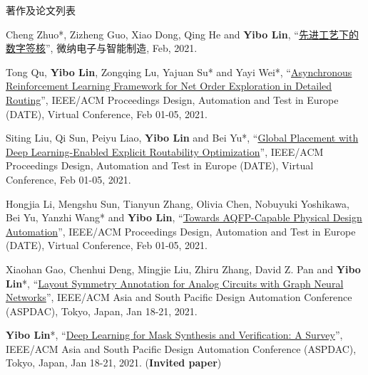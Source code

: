 \begin{rSection}{著作及论文列表}
\begin{description}[font=\normalfont, rightmargin=2em]
{}
            

\item[{[J69]}]{
        Cheng Zhuo*, Zizheng Guo, Xiao Dong, Qing He and \textbf{Yibo Lin}, 
    ``\href{https://doi.org/ 10.19816/j.cnki.10-1594/tn.2021.02.001}{先进工艺下的数字签核}'', 
    微纳电子与智能制造, Feb, 2021.
    
}
            

\item[{[C68]}]{
        Tong Qu, \textbf{Yibo Lin}, Zongqing Lu, Yajuan Su* and Yayi Wei*, 
    ``\href{https://doi.org/10.23919/DATE51398.2021.9474007}{Asynchronous Reinforcement Learning Framework for Net Order Exploration in Detailed Routing}'', 
    IEEE/ACM Proceedings Design, Automation and Test in Europe (DATE), Virtual Conference, Feb 01-05, 2021.
    
}
            

\item[{[C67]}]{
        Siting Liu, Qi Sun, Peiyu Liao, \textbf{Yibo Lin} and Bei Yu*, 
    ``\href{https://doi.org/10.23919/DATE51398.2021.9473959}{Global Placement with Deep Learning-Enabled Explicit Routability Optimization}'', 
    IEEE/ACM Proceedings Design, Automation and Test in Europe (DATE), Virtual Conference, Feb 01-05, 2021.
    
}
            

\item[{[C66]}]{
        Hongjia Li, Mengshu Sun, Tianyun Zhang, Olivia Chen, Nobuyuki Yoshikawa, Bei Yu, Yanzhi Wang* and \textbf{Yibo Lin}, 
    ``\href{https://doi.org/10.23919/DATE51398.2021.9474259}{Towards AQFP-Capable Physical Design Automation}'', 
    IEEE/ACM Proceedings Design, Automation and Test in Europe (DATE), Virtual Conference, Feb 01-05, 2021.
    
}
            

\item[{[C65]}]{
        Xiaohan Gao, Chenhui Deng, Mingjie Liu, Zhiru Zhang, David Z. Pan and \textbf{Yibo Lin}*, 
    ``\href{https://doi.org/10.1145/3394885.3431545}{Layout Symmetry Annotation for Analog Circuits with Graph Neural Networks}'', 
    IEEE/ACM Asia and South Pacific Design Automation Conference (ASPDAC), Tokyo, Japan, Jan 18-21, 2021.
    
}
            

\item[{[C64]}]{
        \textbf{Yibo Lin}*, 
    ``\href{https://doi.org/10.1145/3394885.3431624}{Deep Learning for Mask Synthesis and Verification: A Survey}'', 
    IEEE/ACM Asia and South Pacific Design Automation Conference (ASPDAC), Tokyo, Japan, Jan 18-21, 2021.
    (\textbf{Invited paper})
}
            


\end{description}
\end{rSection}
